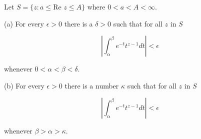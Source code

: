Let $S = \{z : a \leq \text{Re } z \leq A\}$ where $0 < a < A < \infty$.

(a) For every $\epsilon > 0$ there is a $\delta > 0$ such that for all $z$ in $S$

$$\left| \int_{\alpha}^{\beta} e^{-t} t^{z-1} dt \right| < \epsilon$$

whenever $0 < \alpha < \beta < \delta$.

(b) For every $\epsilon > 0$ there is a number $\kappa$ such that for all $z$ in $S$

$$\left| \int_{\alpha}^{\beta} e^{-t} t^{z-1} dt \right| < \epsilon$$

whenever $\beta > \alpha > \kappa$.